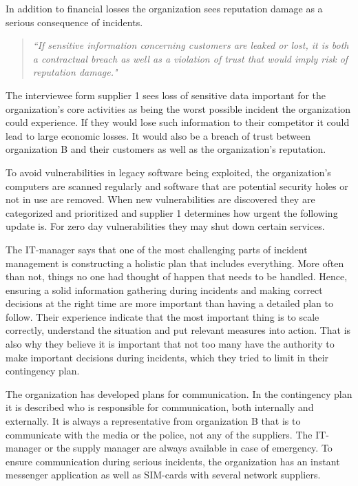 In addition to financial losses the organization sees reputation damage as a serious consequence of incidents. 
\begin{quote}
\textit{``If sensitive information concerning customers are leaked or lost, it is both a contractual breach as well as a violation of trust that would imply risk of reputation damage."}
\end{quote}

The interviewee form supplier 1 sees loss of sensitive data important for the organization's core activities as being the worst possible incident the organization could experience. If they would lose such information to their competitor it could lead to large economic losses. It would also be a breach of trust between organization B and their customers as well as the organization's reputation.	

To avoid vulnerabilities in legacy software being exploited, the organization's computers are scanned regularly and software that are potential security holes or not in use are removed. When new vulnerabilities are discovered they are categorized and prioritized and supplier 1 determines how urgent the following update is. For zero day vulnerabilities they may shut down certain services.

The IT-manager says that one of the most challenging parts of incident management is constructing a holistic plan that includes everything. More often than not, things no one had thought of happen that needs to be handled. Hence, ensuring a solid information gathering during incidents and making correct decisions at the right time are more important than having a detailed plan to follow. Their experience indicate that the most important thing is to scale correctly, understand the situation and put relevant measures into action. That is also why they believe it is important that not too many have the authority to make important decisions during incidents, which they tried to limit in their contingency plan.

The organization has developed plans for communication. In the contingency plan it is described who is responsible for communication, both internally and externally. It is always a representative from organization B that is to communicate with the media or the police, not any of the suppliers. The IT-manager or the supply manager are always available in case of emergency. To ensure communication during serious incidents, the organization has an instant messenger application as well as SIM-cards with several network suppliers. 

